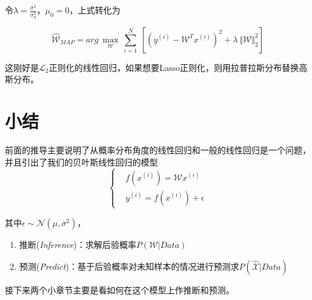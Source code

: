 令$\lambda=\frac{\sigma^2}{\sigma^2_0}$，$\mu_0=0$，上式转化为

\begin{equation}
    \hat{\mathcal{W}}_{MAP}=arg\ \max\limits_{\mathcal{W}}\ \sum\limits_{i=1}^{N}\ \left[ (y^{(i)}-\mathcal{W}^T x^{(i)})^2+\lambda\ \Vert \mathcal{W}\Vert^2_2 \right]
\end{equation}

这刚好是$\mathcal{L}_2$正则化的线性回归，如果想要Lasso正则化，则用拉普拉斯分布替换高斯分布。

\section{小结}

前面的推导主要说明了从概率分布角度的线性回归和一般的线性回归是一个问题，并且引出了我们的贝叶斯线性回归的模型
\begin{equation}
    \left\{
        \begin{aligned}
            &f(x^{(i)})=\mathcal{W}x^{(i)}\\
            &y^{(i)}=f(x^{(i)})+\epsilon
        \end{aligned}
    \right.
\end{equation}


其中$\epsilon\sim \mathcal{N}(\mu,\sigma^2)$，
\begin{enumerate}[itemindent=2em]
    \item 推断(\textsl{Inference})：求解后验概率$P(\mathcal{W}|Data)$
    \item 预测(\textsl{Predict})：基于后验概率对未知样本的情况进行预测求$P(\hat{\mathcal{X}}|Data)$
\end{enumerate}

接下来两个小章节主要是看如何在这个模型上作推断和预测。
